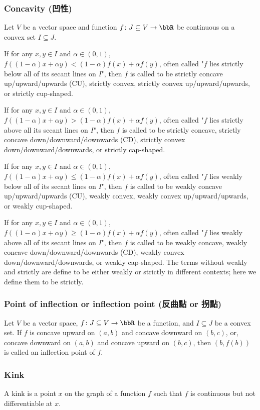 \subsubsection{Concavity (凹性)}
Let $V$ be a vector space and function $f\colon J\subseteq V\to\bbR$ be continuous on a convex set $I\subseteq J$.
\bit
\item If for any $x,y\in I$ and $\alpha\in(0,1)$, $f((1-\alpha)x+\alpha y)<(1-\alpha)f(x)+\alpha f(y)$, often called "$f$ lies strictly below all of its secant lines on $I$", then $f$ is called to be strictly concave up/upward/upwards (CU), strictly convex, strictly convex up/upward/upwards, or strictly cup-shaped.
\item If for any $x,y\in I$ and $\alpha\in(0,1)$, $f((1-\alpha)x+\alpha y)>(1-\alpha)f(x)+\alpha f(y)$, often called "$f$ lies strictly above all its secant lines on $I$", then $f$ is called to be strictly concave, strictly concave down/downward/downwards (CD), strictly convex down/downward/downwards, or strictly cap-shaped.
\item If for any $x,y\in I$ and $\alpha\in(0,1)$, $f((1-\alpha)x+\alpha y)\leq (1-\alpha)f(x)+\alpha f(y)$, often called "$f$ lies weakly below all of its secant lines on $I$", then $f$ is called to be weakly concave up/upward/upwards (CU), weakly convex, weakly convex up/upward/upwards, or weakly cup-shaped.
\item If for any $x,y\in I$ and $\alpha\in(0,1)$, $f((1-\alpha)x+\alpha y)\geq (1-\alpha)f(x)+\alpha f(y)$, often called "$f$ lies weakly above all of its secant lines on $I$", then $f$ is called to be weakly concave, weakly concave down/downward/downwards (CD), weakly convex down/downward/downwards, or weakly cap-shaped.
\eit
The terms without weakly and strictly are define to be either weakly or strictly in different contexts; here we define them to be strictly.
\subsubsection{Point of inflection or inflection point (反曲點 or 拐點)}
Let $V$ be a vector space, $f\colon J\subseteq V\to\bbR$ be a function, and $I\subseteq J$ be a convex set. If $f$ is concave upward on $(a,b)$ and concave downward on $(b,c)$, or, concave downward on $(a,b)$ and concave upward on $(b,c)$, then $(b,f(b))$ is called an inflection point of $f$.
\subsubsection{Kink}
A kink is a point $x$ on the graph of a function $f$ such that $f$ is continuous but not differentiable at $x$.
